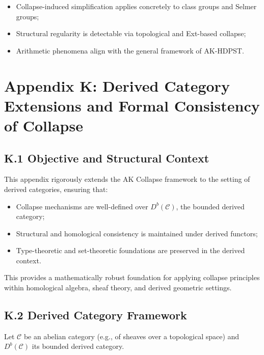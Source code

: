 \documentclass[11pt]{article}
\begin{document}
\begin{itemize}
    \item Collapse-induced simplification applies concretely to class groups and Selmer groups;
    \item Structural regularity is detectable via topological and Ext-based collapse;
    \item Arithmetic phenomena align with the general framework of AK-HDPST.
\end{itemize}



\section*{Appendix K: Derived Category Extensions and Formal Consistency of Collapse}

\subsection*{K.1 Objective and Structural Context}

This appendix rigorously extends the AK Collapse framework to the setting of derived categories, ensuring that:

\begin{itemize}
    \item Collapse mechanisms are well-defined over \( D^b(\mathcal{C}) \), the bounded derived category;
    \item Structural and homological consistency is maintained under derived functors;
    \item Type-theoretic and set-theoretic foundations are preserved in the derived context.
\end{itemize}

This provides a mathematically robust foundation for applying collapse principles within homological algebra, sheaf theory, and derived geometric settings.

\subsection*{K.2 Derived Category Framework}

Let \( \mathcal{C} \) be an abelian category (e.g., of sheaves over a topological space) and \( D^b(\mathcal{C}) \) its bounded derived category.
\end{document}
